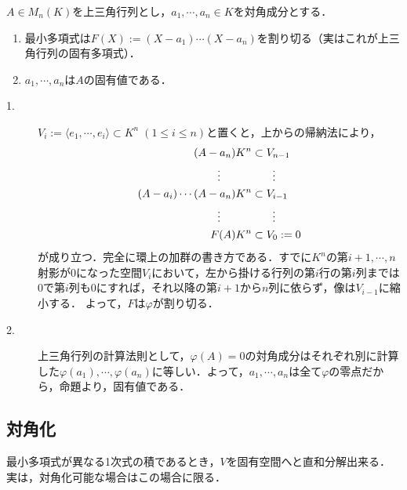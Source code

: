 \documentclass[uplatex, dvipdfmx]{jsreport}
\begin{document}
\begin{proposition}[上三角行列の固有値]\label{prop-eigenvalue-of-triangular-matrices}
    $A\in M_n(K)$を上三角行列とし，$a_1,\cdots,a_n\in K$を対角成分とする．
    \begin{enumerate}
        \item 最小多項式は$F(X):=(X-a_1)\cdots(X-a_n)$を割り切る（実はこれが上三角行列の固有多項式）．
        \item $a_1,\cdots,a_n$は$A$の固有値である．
    \end{enumerate}
\end{proposition}
\begin{Proof}\mbox{}
    \begin{description}
        \item[1.] $V_i:=\langle e_1,\cdots,e_i\rangle\subset K^n\;(1\le i\le n)$と置くと，上からの帰納法により，
        \begin{align*}
            (A-a_n)K^n&\subset V_{n-1}\\
            \vdots\hphantom{\;\;\;\;\;K^n}&\hphantom{\subset}\;\;\;\;\vdots\\
            (A-a_i)\cdots(A-a_n)K^n&\subset V_{i-1}\\
            \vdots\hphantom{\;\;\;\;\;K^n}&\hphantom{\subset}\;\;\;\;\vdots\\
            F(A)K^n&\subset V_0:=0
        \end{align*}
        が成り立つ．完全に環上の加群の書き方である．すでに$K^n$の第$i+1,\cdots,n$射影が$0$になった空間$V_i$において，左から掛ける行列の第$i$行の第$i$列までは$0$で第$i$列も$0$にすれば，それ以降の第$i+1$から$n$列に依らず，像は$V_{i-1}$に縮小する．
        よって，$F$は$\varphi$が割り切る．
        \item[2.] 上三角行列の計算法則として，$\varphi(A)=0$の対角成分はそれぞれ別に計算した$\varphi(a_1),\cdots,\varphi(a_n)$に等しい．よって，$a_1,\cdots,a_n$は全て$\varphi$の零点だから，命題より，固有値である．
    \end{description}
\end{Proof}

\subsection{対角化}

\begin{tcolorbox}[colframe=ForestGreen, colback=ForestGreen!10!white, breakable]
    最小多項式が異なる1次式の積であるとき，$V$を固有空間へと直和分解出来る．
    実は，対角化可能な場合はこの場合に限る．
\end{tcolorbox}
\end{document}
